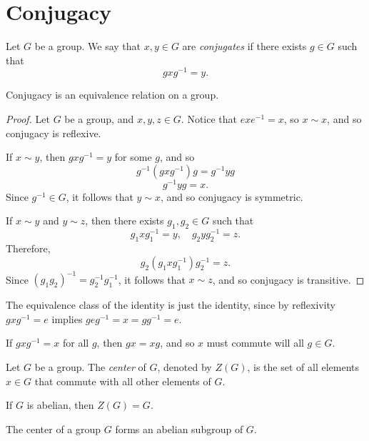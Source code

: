 \section{Conjugacy}

\begin{defn}
    Let $G$ be a group. We say that $x, y \in G$ are \emph{conjugates} if there exists $g \in G$ such that
    \[gxg^{-1} = y.\]
\end{defn}

\begin{prop}\label{conjugacy-equivalence-relation}
    Conjugacy is an equivalence relation on a group.
\end{prop}

\begin{proof}
    Let $G$ be a group, and $x, y, z \in G$. Notice that $exe^{-1} = x$, so $x \sim x$, and so conjugacy is reflexive.

    If $x \sim y$, then $gxg^{-1} = y$ for some $g$, and so
    \[g^{-1}\left(gxg^{-1}\right)g = g^{-1}yg\]
    \[g^{-1}yg = x.\] Since $g^{-1} \in G$, it follows that $y \sim x$, and so conjugacy is symmetric.

    If $x \sim y$ and $y \sim z$, then there exists $g_1, g_2 \in G$ such that
    \[g_1xg_1^{-1} = y, \quad g_2yg_2^{-1} = z.\]
    Therefore,
    \[g_2\left(g_1xg_1^{-1}\right)g_2^{-1} = z.\] Since $(g_1g_2)^{-1} = g_2^{-1}g_1^{-1}$, it follows that $x \sim z$, and so conjugacy is transitive.
\end{proof}

\begin{rmk}
    The equivalence class of the identity is just the identity, since by reflexivity $gxg^{-1} = e$ implies $geg^{-1} = x = gg^{-1} = e$.
\end{rmk}

\begin{rmk}
    If $gxg^{-1} = x$ for all $g$, then $gx = xg$, and so $x$ must commute will all $g \in G$.
\end{rmk}

\begin{defn}
    Let $G$ be a group. The \emph{center} of $G$, denoted by $Z(G)$, is the set of all elements $x \in G$ that commute with all other elements of $G$.
\end{defn}

\begin{rmk}
    If $G$ is abelian, then $Z(G) = G$.
\end{rmk}

\begin{thm}\label{center-abelian-subgroup}
    The center of a group $G$ forms an abelian subgroup of $G$.
\end{thm}

